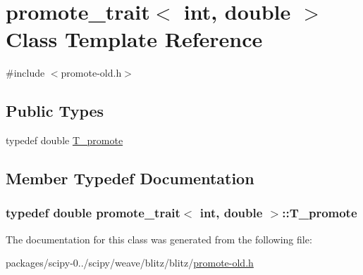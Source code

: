 \hypertarget{classpromote__trait_3_01int_00_01double_01_4}{}\section{promote\+\_\+trait$<$ int, double $>$ Class Template Reference}
\label{classpromote__trait_3_01int_00_01double_01_4}


{\ttfamily \#include $<$promote-\/old.\+h$>$}

\subsection*{Public Types}
\begin{DoxyCompactItemize}
\item 
typedef double \hyperlink{classpromote__trait_3_01int_00_01double_01_4_a25ee28b1ad27547b3f47ac4af67c85f9}{T\+\_\+promote}
\end{DoxyCompactItemize}


\subsection{Member Typedef Documentation}
\hypertarget{classpromote__trait_3_01int_00_01double_01_4_a25ee28b1ad27547b3f47ac4af67c85f9}{}
\subsubsection[{T\+\_\+promote}]{\setlength{\rightskip}{0pt plus 5cm}typedef double {\bf promote\+\_\+trait}$<$ int, double $>$\+::{\bf T\+\_\+promote}}\label{classpromote__trait_3_01int_00_01double_01_4_a25ee28b1ad27547b3f47ac4af67c85f9}


The documentation for this class was generated from the following file\+:\begin{DoxyCompactItemize}
\item 
packages/scipy-\/0../scipy/weave/blitz/blitz/\hyperlink{promote-old_8h}{promote-\/old.\+h}\end{DoxyCompactItemize}
